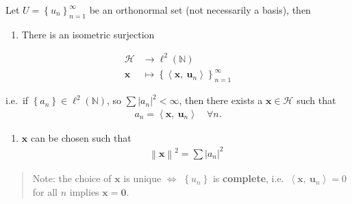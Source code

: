 \begin{theorem}

Let \(U = \left\{{u_{n}}\right\}_{n=1}^\infty\) be an orthonormal set
(not necessarily a basis), then

\begin{enumerate}
\def\labelenumi{\arabic{enumi}.}
\tightlist
\item
  There is an isometric surjection
\end{enumerate}

\begin{align*}
\mathcal{H} &\to \ell^2({\mathbb{N}}) \\
\mathbf{x} &\mapsto \left\{{{\left\langle {\mathbf{x}},~{\mathbf{u}_{n}} \right\rangle}}\right\}_{n=1}^\infty
\end{align*}

i.e.~if \(\left\{{a_{n}}\right\} \in \ell^2({\mathbb{N}})\), so
\(\sum {\left\lvert {a_{n}} \right\rvert}^2 < \infty\), then there
exists a \(\mathbf{x} \in \mathcal{H}\) such that
\begin{align*}
a_{n} = {\left\langle {\mathbf{x}},~{\mathbf{u}_{n}} \right\rangle} \quad \forall n.
\end{align*}

\begin{enumerate}
\def\labelenumi{\arabic{enumi}.}
\setcounter{enumi}{1}
\tightlist
\item
  \(\mathbf{x}\) can be chosen such that
  \begin{align*}
  {\left\lVert {\mathbf{x}} \right\rVert}^2 = \sum {\left\lvert {a_{n}} \right\rvert}^2
  \end{align*}
\end{enumerate}

\begin{quote}
Note: the choice of \(\mathbf{x}\) is unique \(\iff\)
\(\left\{{u_{n}}\right\}\) is \textbf{complete},
i.e.~\({\left\langle {\mathbf{x}},~{\mathbf{u}_{n}} \right\rangle} = 0\)
for all \(n\) implies \(\mathbf{x} = \mathbf{0}\).
\end{quote}

\end{theorem}

